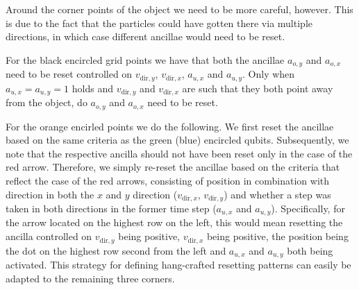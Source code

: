 Around the corner points of the object we need to be more careful, however. This is due to the fact that the particles could have gotten there via multiple directions, in which case different ancillae would need to be reset. 

For the black encircled grid points we have that both the ancillae $a_{o,y}$ and $a_{o,x}$ need to be reset controlled on $v_{\text{dir},y}$, $v_{\text{dir},x}$, $a_{u,x}$ and $a_{u,y}$. Only when $a_{u,x} = a_{u,y} = 1$ holds and $v_{\text{dir},y}$ and $v_{\text{dir},x}$ are such that they both point away from the object, do $a_{o,y}$ and $a_{o,x}$ need to be reset.

For the orange encirled points we do the following. We first reset the ancillae based on the same criteria as the green (blue) encircled qubits. Subsequently, we note that the respective ancilla should not have been reset only in the case of the red arrow. Therefore, we simply re-reset the ancillae based on the criteria that reflect the case of the red arrows, consisting of position in combination with direction in both the $x$ and $y$ direction ($v_{\text{dir},x}$, $v_{\text{dir},y}$) and whether a step was taken in both directions in the former time step ($a_{u,x}$ and $a_{u,y}$). Specifically, for the arrow located on the highest row on the left, this would mean resetting the ancilla controlled on $v_{\text{dir},y}$ being positive, $v_{\text{dir},x}$ being positive, the position being the dot on the highest row second from the left and $a_{u,x}$ and $a_{u,y}$ both being activated.
This strategy for defining hang-crafted resetting patterns can easily be adapted to the remaining three corners.




